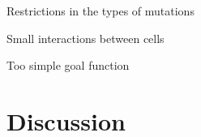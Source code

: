 \documentclass[10pt,a4paper]{article}
\begin{document}
Restrictions in the types of mutations

Small interactions between cells

Too simple goal function



\section{Discussion}
\label{sec:discussion}


%	
%	
%	
%	  
%	
%	
\end{document}
